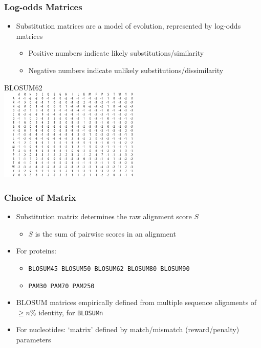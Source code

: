 \documentclass[table]{beamer}
\begin{document}
    \begin{frame}
     \frametitle{Log-odds Matrices}
     \begin{itemize}
       \item Substitution matrices are a model of evolution, represented by log-odds matrices
       \begin{itemize}
         \item Positive numbers indicate likely substitutions/similarity
         \item Negative numbers indicate unlikely substitutions/dissimilarity
       \end{itemize}
     \end{itemize}
    \begin{center}
      BLOSUM62 \\
      \includegraphics[width=0.5\textwidth]{images/blosum62} 
    \end{center}         
    \end{frame} 

    \begin{frame}
     \frametitle{Choice of Matrix}
     \begin{itemize}
       \item Substitution matrix determines the raw alignment score $S$
       \begin{itemize}
         \item $S$ is the sum of pairwise scores in an alignment
       \end{itemize}
       \item For proteins:
       \begin{itemize}
         \item \texttt{BLOSUM45 BLOSUM50 BLOSUM62 BLOSUM80 BLOSUM90}
         \item \texttt{PAM30 PAM70 PAM250}
       \end{itemize}
       \item BLOSUM matrices empirically defined from multiple sequence alignments of $\geq n\%$ identity, for \texttt{BLOSUMn}
       \item For nucleotides: `matrix' defined by match/mismatch (reward/penalty) parameters
     \end{itemize}
    \end{frame} 
  
\end{document}
